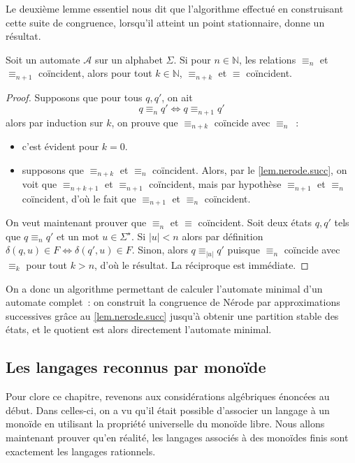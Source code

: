 Le deuxième lemme essentiel nous dit que l'algorithme effectué en construisant
cette suite de congruence, lorsqu'il atteint un point stationnaire, donne un
résultat.

\begin{lemma}
  Soit un automate $\mathcal A$ sur un alphabet $\Sigma$. Si pour
  $n \in \mathbb N$, les relations $\equiv_n$ et $\equiv_{n+1}$ coïncident,
  alors pour tout $k \in \mathbb N$, $\equiv_{n+k}$ et $\equiv$ coïncident.
\end{lemma}

\begin{proof}
  Supposons que pour tous $q,q'$, on ait
  \[q\equiv_n q' \iff q\equiv_{n+1} q'\]
  alors par induction sur $k$, on prouve que $\equiv_{n+k}$ coïncide avec
  $\equiv_n$~:
  \begin{itemize}
  \item c'est évident pour $k = 0$.
  \item supposons que $\equiv_{n+k}$ et $\equiv_n$ coïncident. Alors, par le
    \cref{lem.nerode.succ}, on voit que $\equiv_{n+k+1}$ et $\equiv_{n+1}$
    coïncident, mais par hypothèse $\equiv_{n+1}$ et $\equiv_n$ coïncident,
    d'où le fait que $\equiv_{n+1}$ et $\equiv_n$ coïncident.
  \end{itemize}

  On veut maintenant prouver que $\equiv_n$ et $\equiv$ coïncident. Soit deux
  états $q,q'$ tels que $q\equiv_n q'$ et un mot $u \in \Sigma^\star$. Si
  $|u| < n$ alors par définition $\delta(q,u) \in F \iff \delta(q',u) \in F$.
  Sinon, alors $q\equiv_{|u|} q'$ puisque $\equiv_n$ coïncide avec $\equiv_k$
  pour tout $k > n$, d'où le résultat. La réciproque est immédiate.
\end{proof}

On a donc un algorithme permettant de calculer l'automate minimal d'un automate
complet~: on construit la congruence de Nérode par approximations successives
grâce au \cref{lem.nerode.succ} jusqu'à obtenir une partition stable des états,
et le quotient est alors directement l'automate minimal.

\subsection{Les langages reconnus par monoïde}

Pour clore ce chapitre, revenons aux considérations algébriques énoncées au
début. Dans celles-ci, on a vu qu'il était possible d'associer un langage à un
monoïde en utilisant la propriété universelle du monoïde libre. Nous allons
maintenant prouver qu'en réalité, les langages associés à des monoïdes finis
sont exactement les langages rationnels.

